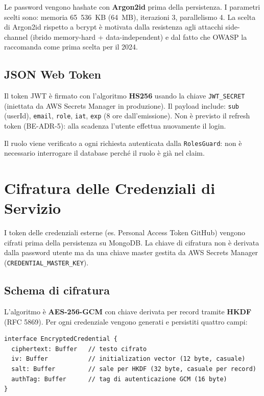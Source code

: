 \documentclass[11pt,a4paper]{article}
\begin{document}
Le password vengono hashate con \textbf{Argon2id} prima della persistenza. I parametri scelti sono: memoria 65~536~KB (64~MB), iterazioni 3, parallelismo 4. La scelta di Argon2id rispetto a bcrypt è motivata dalla resistenza agli attacchi side-channel (ibrido memory-hard + data-independent) e dal fatto che OWASP la raccomanda come prima scelta per il 2024.

\subsection{JSON Web Token}

Il token JWT è firmato con l'algoritmo \textbf{HS256} usando la chiave \texttt{JWT\_SECRET} (iniettata da AWS Secrets Manager in produzione). Il payload include: \texttt{sub} (userId), \texttt{email}, \texttt{role}, \texttt{iat}, \texttt{exp} (8 ore dall'emissione). Non è previsto il refresh token (BE-ADR-5): alla scadenza l'utente effettua nuovamente il login.

Il ruolo viene verificato a ogni richiesta autenticata dalla \texttt{RolesGuard}: non è necessario interrogare il database perché il ruolo è già nel claim.

\section{Cifratura delle Credenziali di Servizio}
\label{sec:be-credenziali}

I token delle credenziali esterne (es. Personal Access Token GitHub) vengono cifrati prima della persistenza su MongoDB. La chiave di cifratura non è derivata dalla password utente ma da una chiave master gestita da AWS Secrets Manager (\texttt{CREDENTIAL\_MASTER\_KEY}).

\subsection{Schema di cifratura}

L'algoritmo è \textbf{AES-256-GCM} con chiave derivata per record tramite \textbf{HKDF} (RFC 5869). Per ogni credenziale vengono generati e persistiti quattro campi:

\begin{lstlisting}[caption={Struttura dati persistita per ogni credenziale cifrata.}]
interface EncryptedCredential {
  ciphertext: Buffer   // testo cifrato
  iv: Buffer           // initialization vector (12 byte, casuale)
  salt: Buffer         // sale per HKDF (32 byte, casuale per record)
  authTag: Buffer      // tag di autenticazione GCM (16 byte)
}
\end{lstlisting}
\end{document}
